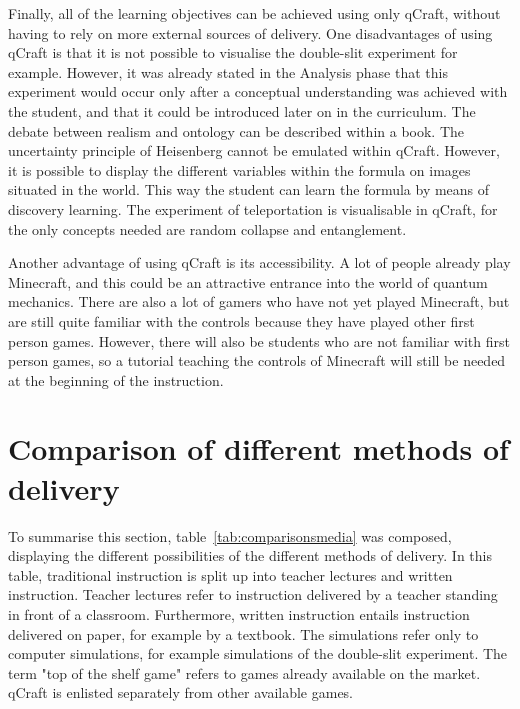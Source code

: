 \documentclass[11pt,twoside]{report} %
\begin{document}
Finally, all of the learning objectives can be achieved using only qCraft, without having to rely on more external sources of delivery. One disadvantages of using qCraft is that it is not possible to visualise the double-slit experiment for example. However, it was already stated in the Analysis phase that this experiment would occur only after a conceptual understanding was achieved with the student, and that it could be introduced later on in the curriculum. The debate between realism and ontology can be described within a book. The uncertainty principle of Heisenberg cannot be emulated within qCraft. However, it is possible to display the different variables within the formula on images situated in the world. This way the student can learn the formula by means of discovery learning. The experiment of teleportation is visualisable in qCraft, for the only concepts needed are random collapse and entanglement.

Another advantage of using qCraft is its accessibility. A lot of people already play Minecraft, and this could be an attractive entrance into the world of quantum mechanics. There are also a lot of gamers who have not yet played Minecraft, but are still quite familiar with the controls because they have played other first person games. However, there will also be students who are not familiar with first person games, so a tutorial teaching the controls of Minecraft will still be needed at the beginning of the instruction.

\section{Comparison of different methods of delivery}

To summarise this section, table~\ref{tab:comparisonsmedia} was composed, displaying the different possibilities of the different methods of delivery. In this table, traditional instruction is split up into teacher lectures and written instruction. Teacher lectures refer to instruction delivered by a teacher standing in front of a classroom. Furthermore, written instruction entails instruction delivered on paper, for example by a textbook. The simulations refer only to computer simulations, for example simulations of the double-slit experiment. The term "top of the shelf game" refers to games already available on the market. qCraft is enlisted separately from other available games.
\end{document}
